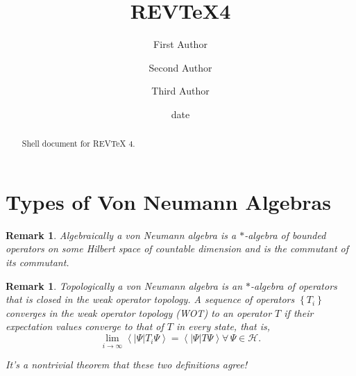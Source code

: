\documentclass[aps,preprint]{revtex4}%
\newtheorem{remark}[theorem]{Remark}
\begin{document}
\title[Short title for running header]{REV\TeX4}
\author{First Author}
\author{Second Author}
\author{Third Author}

\begin{abstract}
Shell document for REV\TeX{} 4.

\end{abstract}
\date[Date text]{date}




\maketitle
\tableofcontents


\section{Types of Von Neumann Algebras}

\begin{remark}
Algebraically a von Neumann algebra is a $\ast$-algebra of bounded operators
on some Hilbert space of countable dimension and is the commutant of its commutant.
\end{remark}

\begin{remark}
Topologically a von Neumann algebra is an $\ast$-algebra of operators that is
closed in the \emph{weak operator topology. }A sequence of operators $\left\{
T_{i}\right\}  $ converges in the \emph{weak operator topology (WOT)} to an
operator $T$ if their expectation values converge to that of $T$ in every
state, that is,
\begin{equation}
\lim\limits_{i\rightarrow\infty}\left\langle \left\vert \Psi\right\vert
T_{i}\Psi\right\rangle =\left\langle \left\vert \Psi\right\vert T\Psi
\right\rangle \forall\,\Psi\in\mathcal{H}.
\end{equation}

\end{remark}

\emph{It's a nontrivial theorem that these two definitions agree!}
\end{document}
